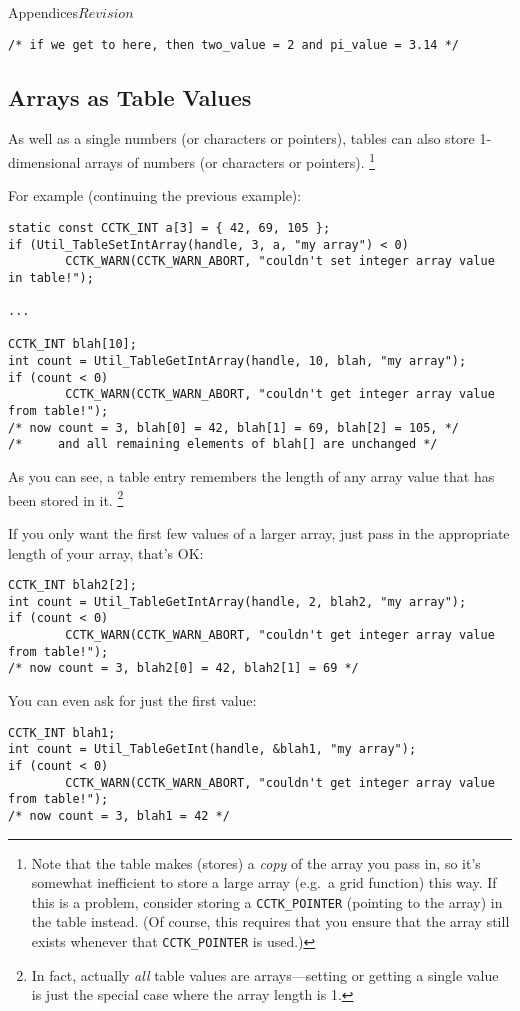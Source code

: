 \begin{cactuspart}{Appendices}{}{$Revision$}
\begin{verbatim}
/* if we get to here, then two_value = 2 and pi_value = 3.14 */
\end{verbatim}


\subsection{Arrays as Table Values}

As well as a single numbers (or characters or pointers), tables can
also store 1-dimensional arrays of numbers (or characters or pointers).%
\footnote{%
	 Note that the table makes (stores) a \emph{copy} of the array
	 you pass in, so it's somewhat inefficient to store a large array
	 (e.g.~a grid function) this way.  If this is a problem, consider
	 storing a \texttt{CCTK\_POINTER} (pointing to the array) in the table
	 instead.  (Of course, this requires that you ensure that the array still exists whenever that \texttt{CCTK\_POINTER} is used.)
	 }%

For example (continuing the previous example):
\begin{verbatim}
static const CCTK_INT a[3] = { 42, 69, 105 };
if (Util_TableSetIntArray(handle, 3, a, "my array") < 0)
        CCTK_WARN(CCTK_WARN_ABORT, "couldn't set integer array value in table!");

...

CCTK_INT blah[10];
int count = Util_TableGetIntArray(handle, 10, blah, "my array");
if (count < 0)
        CCTK_WARN(CCTK_WARN_ABORT, "couldn't get integer array value from table!");
/* now count = 3, blah[0] = 42, blah[1] = 69, blah[2] = 105, */
/*     and all remaining elements of blah[] are unchanged */
\end{verbatim}
As you can see, a table entry remembers the length of any array
value that has been stored in it.%
\footnote{%
	 In fact, actually \emph{all} table values are
	 arrays---setting or getting a single value is
	 just the special case where the array length is 1.
	 }%
{}

If you only want the first few values of a larger array, just pass
in the appropriate length of your array,
that's OK:
\begin{verbatim}
CCTK_INT blah2[2];
int count = Util_TableGetIntArray(handle, 2, blah2, "my array");
if (count < 0)
        CCTK_WARN(CCTK_WARN_ABORT, "couldn't get integer array value from table!");
/* now count = 3, blah2[0] = 42, blah2[1] = 69 */
\end{verbatim}
You can even ask for just the first value:
\begin{verbatim}
CCTK_INT blah1;
int count = Util_TableGetInt(handle, &blah1, "my array");
if (count < 0)
        CCTK_WARN(CCTK_WARN_ABORT, "couldn't get integer array value from table!");
/* now count = 3, blah1 = 42 */
\end{verbatim}


\end{cactuspart}
